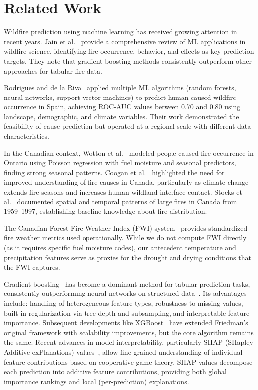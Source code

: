 \documentclass[sigconf,nonacm]{acmart}
\begin{document}
\section{Related Work}

Wildfire prediction using machine learning has received growing attention in recent years. Jain et al.~\cite{jain2020} provide a comprehensive review of ML applications in wildfire science, identifying fire occurrence, behavior, and effects as key prediction targets. They note that gradient boosting methods consistently outperform other approaches for tabular fire data.

Rodrigues and de la Riva~\cite{rodrigues2014} applied multiple ML algorithms (random forests, neural networks, support vector machines) to predict human-caused wildfire occurrence in Spain, achieving ROC-AUC values between 0.70 and 0.80 using landscape, demographic, and climate variables. Their work demonstrated the feasibility of cause prediction but operated at a regional scale with different data characteristics.

In the Canadian context, Wotton et al.~\cite{wotton2003} modeled people-caused fire occurrence in Ontario using Poisson regression with fuel moisture and seasonal predictors, finding strong seasonal patterns. Coogan et al.~\cite{coogan2019} highlighted the need for improved understanding of fire causes in Canada, particularly as climate change extends fire seasons and increases human-wildland interface contact. Stocks et al.~\cite{stocks2002} documented spatial and temporal patterns of large fires in Canada from 1959--1997, establishing baseline knowledge about fire distribution.

The Canadian Forest Fire Weather Index (FWI) system~\cite{vanwagner1987} provides standardized fire weather metrics used operationally. While we do not compute FWI directly (as it requires specific fuel moisture codes), our antecedent temperature and precipitation features serve as proxies for the drought and drying conditions that the FWI captures.

Gradient boosting~\cite{friedman2001} has become a dominant method for tabular prediction tasks, consistently outperforming neural networks on structured data~\cite{grinsztajn2022treebased}. Its advantages include: handling of heterogeneous feature types, robustness to missing values, built-in regularization via tree depth and subsampling, and interpretable feature importance. Subsequent developments like XGBoost~\cite{chen2016} have extended Friedman's original framework with scalability improvements, but the core algorithm remains the same. Recent advances in model interpretability, particularly SHAP (SHapley Additive exPlanations) values~\cite{lundberg2017}, allow fine-grained understanding of individual feature contributions based on cooperative game theory. SHAP values decompose each prediction into additive feature contributions, providing both global importance rankings and local (per-prediction) explanations.
\end{document}
